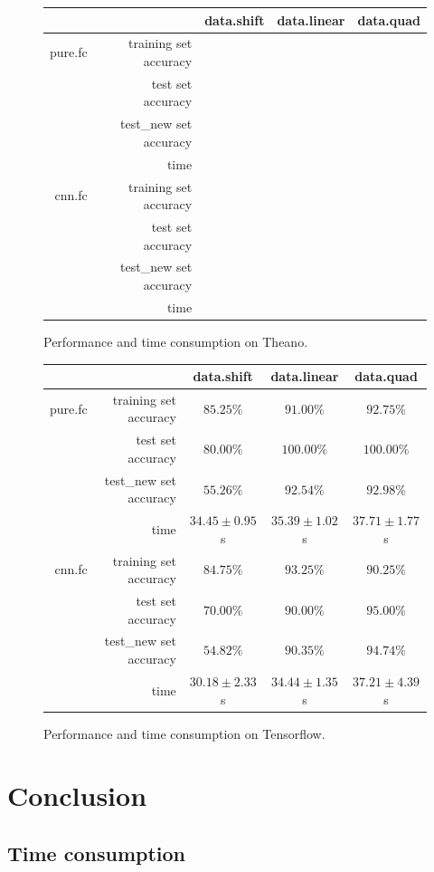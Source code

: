 \documentclass[a4paper]{article}
\begin{document}
\begin{figure}[H]
\centering
\begin{tabular}{|r|r|c|c|c|}
\hline
 & & data.shift & data.linear & data.quad \\
\hline
pure.fc & training set accuracy & \\
 & test set accuracy & \\
 & test\_new set accuracy & \\
 & time & \\
\hline
cnn.fc & training set accuracy & \\
 & test set accuracy & \\
 & test\_new set accuracy & \\
 & time & \\
\hline
\end{tabular}
\caption{Performance and time consumption on Theano.}
\end{figure}

\begin{figure}[H]
\centering
\begin{tabular}{|r|r|c|c|c|}
\hline
 & & data.shift & data.linear & data.quad \\
\hline
pure.fc & training set accuracy & $85.25\%$ & $91.00\%$ & $92.75\%$ \\
 & test set accuracy & $80.00\%$ & $\mathbf{100.00\%}$ & $\mathbf{100.00\%}$ \\
 & test\_new set accuracy & $55.26\%$ & $92.54\%$ & $92.98\%$ \\
 & time & $34.45\pm0.95$s & $35.39\pm1.02$s & $37.71\pm1.77$s \\
\hline
cnn.fc & training set accuracy & $84.75\%$ & $93.25\%$ & $90.25\%$ \\
 & test set accuracy & $70.00\%$ & $90.00\%$ & $95.00\%$ \\
 & test\_new set accuracy & $54.82\%$ & $90.35\%$ & $\mathbf{94.74\%}$ \\
 & time & $30.18\pm2.33$s & $34.44\pm1.35$s & $37.21\pm4.39$s \\
\hline
\end{tabular}
\caption{Performance and time consumption on Tensorflow.}
\end{figure}

\section{Conclusion}

\subsection{Time consumption}
\end{document}
